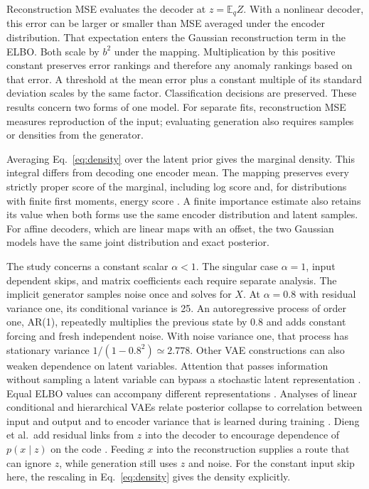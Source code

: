 \documentclass{article}
\newcommand{\E}{\mathbb{E}}
\begin{document}
Reconstruction MSE evaluates the decoder at $z=\E_q Z$. With a nonlinear decoder, this error can be larger or smaller than MSE averaged under the encoder distribution. That expectation enters the Gaussian reconstruction term in the ELBO. Both scale by $b^2$ under the mapping. Multiplication by this positive constant preserves error rankings and therefore any anomaly rankings based on that error. A threshold at the mean error plus a constant multiple of its standard deviation scales by the same factor. Classification decisions are preserved. These results concern two forms of one model. For separate fits, reconstruction MSE measures reproduction of the input; evaluating generation also requires samples or densities from the generator.

Averaging Eq.~\ref{eq:density} over the latent prior gives the marginal density. This integral differs from decoding one encoder mean. The mapping preserves every strictly proper score of the marginal, including log score and, for distributions with finite first moments, energy score \citep{GneitingRaftery2007ProperScoringRules}. A finite importance estimate also retains its value when both forms use the same encoder distribution and latent samples. For affine decoders, which are linear maps with an offset, the two Gaussian models have the same joint distribution and exact posterior.

The study concerns a constant scalar $\alpha<1$. The singular case $\alpha=1$, input dependent skips, and matrix coefficients each require separate analysis. The implicit generator samples noise once and solves for $X$. At $\alpha=0.8$ with residual variance one, its conditional variance is 25. An autoregressive process of order one, AR(1), repeatedly multiplies the previous state by 0.8 and adds constant forcing and fresh independent noise. With noise variance one, that process has stationary variance $1/(1-0.8^2)\simeq2.778$.
Other VAE constructions can also weaken dependence on latent variables. Attention that passes information without sampling a latent variable can bypass a stochastic latent representation \citep{Bahuleyan2018VariationalAttention}. Equal ELBO values can accompany different representations \citep{Alemi2018FixingBrokenELBO}. Analyses of linear conditional and hierarchical VAEs relate posterior collapse to correlation between input and output and to encoder variance that is learned during training \citep{Dang2024BeyondVanilla}. Dieng et al.\ add residual links from $z$ into the decoder to encourage dependence of $p(x\mid z)$ on the code \citep{Dieng2019SkipVAE}. Feeding $x$ into the reconstruction supplies a route that can ignore $z$, while generation still uses $z$ and noise. For the constant input skip here, the rescaling in Eq.~\ref{eq:density} gives the density explicitly.
\end{document}
